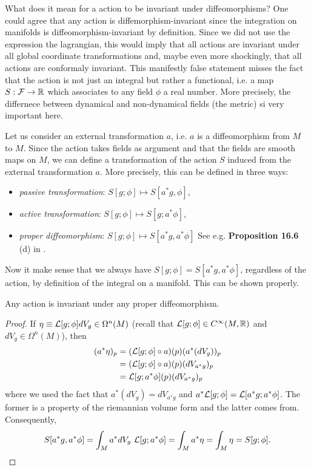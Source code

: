 \documentclass[a4paper,10pt]{article}
\begin{document}
        What does it mean for a action to be invariant under diffeomorphisms? One could agree that any action is diffemorphism-invariant since the integration on manifolds is diffeomorphism-invariant by definition. Since we did not use the expression the lagrangian, this would imply that all actions are invariant under all global coordinate transformations and, maybe even more shockingly, that all actions are conformaly invariant. This manifestly false statement misses the fact that the action is not just an integral but rather a functional, i.e. a map $S:\mathcal{F}\to\mathbb{R}$ which associates to any field $\phi$ a real number. More precisely, the differnece between dynamical and non-dynamical fields (the metric) si very important here.

        Let us consider an external transformation $a$, i.e. $a$ is a diffeomorphism from $M$ to $M$. Since the action takes fields as argument and that the fields are smooth maps on $M$, we can define a transformation of the action $S$ induced from the external transformation $a$. More precisely, this can be defined in three ways:
        \begin{itemize}
            \item \emph{passive transformation}: $S[g;\phi]\mapsto S[a^*g,\phi]$,
            \item \emph{active transformation}: $S[g;\phi]\mapsto S[g;a^*\phi]$,
            \item \emph{proper diffeomorphism}: $S[g;\phi]\mapsto S[a^*g,a^*\phi]$  See e.g. \textbf{Proposition 16.6} (d) in \cite{Lee_2012}.
        \end{itemize}
        Now it make sense that we always have $S[g;\phi]=S[a^*g,a^*\phi]$, regardless of the action, by definition of the integral on a manifold. This can be shown properly.
        \begin{prop}
            Any action is invariant under any proper diffeomorphism.
        \end{prop}
        \begin{proof}
            If $\eta\equiv\mathcal{L}[g;\phi]dV_g\in\Omega^n(M)$ (recall that $\mathcal{L}[g;\phi]\in C^\infty(M,\mathbb{R})$ and $dV_g\in\Omega^n(M)$), then
            \begin{align}
                (a^*\eta)_p&=(\mathcal{L}[g;\phi]\circ a)(p)(a^*(dV_g))_p\\
                &= (\mathcal{L}[g;\phi]\circ a)(p)(dV_{a^*g})_p\\
                &= \mathcal{L}[g;a^*\phi](p)(dV_{a^*g})_p
            \end{align}
            where we used the fact that $a^*(dV_g)=dV_{a^*g}$ and $a^*\mathcal{L}[g;\phi]=\mathcal{L}[a^*g;a^*\phi]$. The former is a property of the riemannian volume form and the latter comes from. Consequently,
            \begin{equation}
                S[a^*g,a^*\phi] = \int_M a^*dV_g~\mathcal{L}[g;a^*\phi] = \int_M a^*\eta = \int_M \eta = S[g;\phi].
            \end{equation}
        \end{proof}
\end{document}
